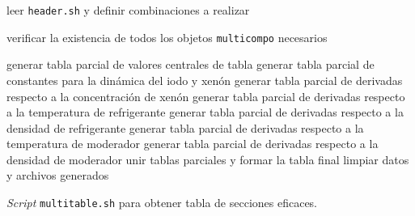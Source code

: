 \documentclass[11pt]{article}
\begin{document}
\medskip
\begin{algorithm}[H]
 
 
 leer \texttt{header.sh} y definir combinaciones a realizar\;
 
 verificar la existencia de todos los objetos \texttt{multicompo} necesarios\;
 
 generar tabla parcial de valores centrales de tabla\;
 generar tabla parcial de constantes para la dinámica del iodo y xenón\;
 generar tabla parcial de derivadas respecto a la concentración de xenón\;
 generar tabla parcial de derivadas respecto a la temperatura de refrigerante\;
 generar tabla parcial de derivadas respecto a la densidad de refrigerante\;
 generar tabla parcial de derivadas respecto a la temperatura de moderador\;
 generar tabla parcial de derivadas respecto a la densidad de moderador\;
 unir tablas parciales y formar la tabla final \;
 limpiar datos y archivos generados\;

 \caption{\emph{Script} \texttt{multitable.sh} para obtener tabla de secciones eficaces.\label{algo:multitable-simple}}
\end{algorithm}
\medskip

\label{lastpage}

\printbibliography
\end{document}

